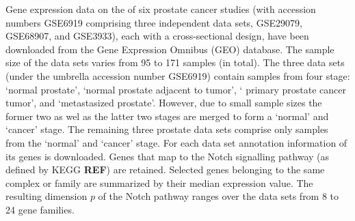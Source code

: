 \documentclass[10pt]{article}
\newcommand{\red}[1]{{\textcolor {red} {#1}}}
\begin{document}
Gene expression data on the of six prostate cancer studies (with accession numbers GSE6919 comprising three independent data sets,  GSE29079, GSE68907, and GSE3933), each with a cross-sectional design, have been downloaded from the Gene Expression Omnibus (GEO) database. The sample size of the data sets varies from 95 to 171 samples (in total). The three data sets (under the umbrella accession number GSE6919) contain samples from four stage: `normal prostate', `normal prostate adjacent to tumor', ` primary prostate cancer tumor', and `metastasized prostate'. However, due to small sample sizes the former two as wel as the latter two stages are merged to form a `normal'  and `cancer' stage. The remaining three prostate data sets comprise only samples from the `normal'  and `cancer' stage. For each data set annotation information of its genes is downloaded. Genes that map to the Notch signalling pathway (as defined by KEGG \textbf{REF}) are retained. Selected genes belonging to the same complex or family are summarized by their median expression value. The resulting dimension $p$ of the Notch pathway ranges over the data sets from 8 to 24 gene families.


\end{document}
